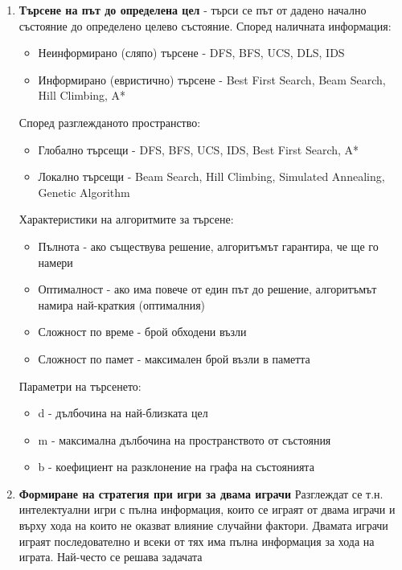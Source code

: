 \documentclass{article}
\begin{document}
\begin{enumerate}
    \item \textbf{Търсене на път до определена цел} - търси се път от дадено начално състояние до определено целево състояние. \newline\newline
    Според наличната информация:
    \begin{itemize}
        \item Неинформирано (сляпо) търсене - DFS, BFS, UCS, DLS, IDS
        \item Информирано (евристично) търсене - Best First Search, Beam Search, Hill Climbing, A* 
    \end{itemize}
    Според разглежданото пространство:
    \begin{itemize}
        \item Глобално търсещи - DFS, BFS, UCS, IDS, Best First Search, A*
        \item Локално търсещи - Beam Search, Hill Climbing, Simulated Annealing, Genetic Algorithm
    \end{itemize}
    Характеристики на алгоритмите за търсене:
    \begin{itemize}
        \item Пълнота - ако съществува решение, алгоритъмът гарантира, че ще го намери
        \item Оптималност - ако има повече от един път до решение, алгоритъмът намира най-краткия (оптималния)
        \item Сложност по време - брой обходени възли
        \item Сложност по памет - максимален брой възли в паметта
    \end{itemize}
    Параметри на търсенето:
    \begin{itemize}
        \item d - дълбочина на най-близката цел
        \item m - максимална дълбочина на пространството от състояния
        \item b - коефициент на разклонение на графа на състоянията
    \end{itemize}
    \item \textbf{Формиране на стратегия при игри за двама играчи} \newline\newline
    Разглеждат се т.н. интелектуални игри с пълна информация, които се играят от двама играчи и върху хода на които не оказват влияние
    случайни фактори. Двамата играчи играят последователно и всеки от тях има пълна информация за хода на играта. Най-често се решава задачата

\end{enumerate}
\end{document}
